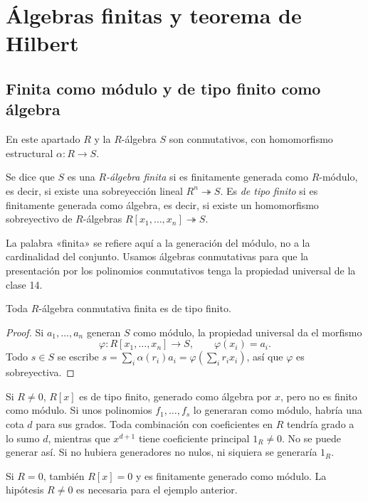 \section{Álgebras finitas y teorema de Hilbert}
\subsection{Finita como módulo y de tipo finito como álgebra}
En este apartado $R$ y la $R$-álgebra $S$ son conmutativos, con homomorfismo estructural $\alpha:R\to S$.
\begin{defi}
Se dice que $S$ es una \emph{$R$-álgebra finita} si es finitamente generada como $R$-módulo, es decir, si existe una sobreyección lineal $R^n\twoheadrightarrow S$. Es \emph{de tipo finito} si es finitamente generada como álgebra, es decir, si existe un homomorfismo sobreyectivo de $R$-álgebras $R[x_1,\ldots,x_n]\twoheadrightarrow S$.
\end{defi}
La palabra «finita» se refiere aquí a la generación del módulo, no a la cardinalidad del conjunto. Usamos álgebras conmutativas para que la presentación por los polinomios conmutativos tenga la propiedad universal de la clase 14.

\begin{prop}
Toda $R$-álgebra conmutativa finita es de tipo finito.
\end{prop}
\begin{proof}
Si $a_1,\ldots,a_n$ generan $S$ como módulo, la propiedad universal da el morfismo
\[
\varphi:R[x_1,\ldots,x_n]\longrightarrow S,\qquad\varphi(x_i)=a_i.
\]
Todo $s\in S$ se escribe $s=\sum_i\alpha(r_i)a_i=\varphi(\sum_i r_ix_i)$, así que $\varphi$ es sobreyectiva.
\end{proof}

\begin{ejem}
Si $R\ne0$, $R[x]$ es de tipo finito, generado como álgebra por $x$, pero no es finito como módulo. Si unos polinomios $f_1,\ldots,f_s$ lo generaran como módulo, habría una cota $d$ para sus grados. Toda combinación con coeficientes en $R$ tendría grado a lo sumo $d$, mientras que $x^{d+1}$ tiene coeficiente principal $1_R\ne0$. No se puede generar así. Si no hubiera generadores no nulos, ni siquiera se generaría $1_R$.
\end{ejem}
\begin{obs}
Si $R=0$, también $R[x]=0$ y es finitamente generado como módulo. La hipótesis $R\ne0$ es necesaria para el ejemplo anterior.
\end{obs}

